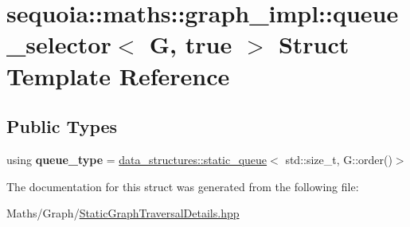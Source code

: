\hypertarget{structsequoia_1_1maths_1_1graph__impl_1_1queue__selector_3_01_g_00_01true_01_4}{}\section{sequoia\+::maths\+::graph\+\_\+impl\+::queue\+\_\+selector$<$ G, true $>$ Struct Template Reference}
\label{structsequoia_1_1maths_1_1graph__impl_1_1queue__selector_3_01_g_00_01true_01_4}
\subsection*{Public Types}
\begin{DoxyCompactItemize}
\item 
\mbox{\label{structsequoia_1_1maths_1_1graph__impl_1_1queue__selector_3_01_g_00_01true_01_4_a44e5b12d4a50999c05f09b4b20e44b99}} 
using {\bfseries queue\+\_\+type} = \mbox{\hyperlink{classsequoia_1_1data__structures_1_1static__queue}{data\+\_\+structures\+::static\+\_\+queue}}$<$ std\+::size\+\_\+t, G\+::order()$>$
\end{DoxyCompactItemize}


The documentation for this struct was generated from the following file\+:\begin{DoxyCompactItemize}
\item 
Maths/\+Graph/\mbox{\hyperlink{_static_graph_traversal_details_8hpp}{Static\+Graph\+Traversal\+Details.\+hpp}}\end{DoxyCompactItemize}
